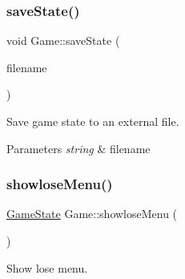 \subsubsection{\texorpdfstring{save\+State()}{saveState()}}
{\footnotesize\ttfamily void Game\+::save\+State (\begin{DoxyParamCaption}\item[{string}]{filename }\end{DoxyParamCaption})}



Save game state to an external file. 


\begin{DoxyParams}{Parameters}
{\em string} & filename \\
\hline
\end{DoxyParams}
\mbox{\label{class_game_a6b065cbc7a8a804ce90b5e5463b8ebfd}} 
\subsubsection{\texorpdfstring{showlose\+Menu()}{showloseMenu()}}
{\footnotesize\ttfamily \mbox{\hyperlink{_constants_8hpp_a7899b65f1ea0f655e4bbf8d2a5714285}{Game\+State}} Game\+::showlose\+Menu (\begin{DoxyParamCaption}{ }\end{DoxyParamCaption})}



Show lose menu. 

